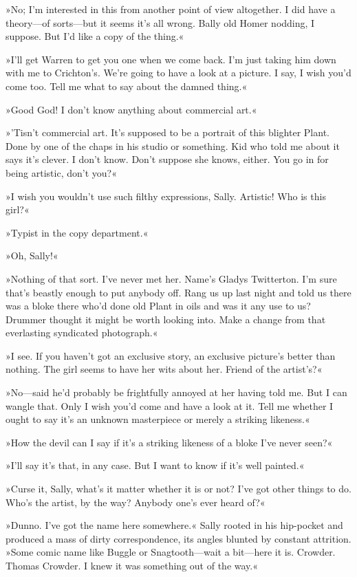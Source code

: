 »No; I'm interested in this from another point of view altogether. I did have a theory—of sorts—but it seems it's all wrong. Bally old Homer nodding, I suppose. But I'd like a copy of the thing.«

»I'll get Warren to get you one when we come back. I'm just taking him down with me to Crichton's. We're going to have a look at a picture. I say, I wish you'd come too. Tell me what to say about the damned thing.«

»Good God! I don't know anything about commercial art.«

»'Tisn't commercial art. It's supposed to be a portrait of this blighter Plant. Done by one of the chaps in his studio or something. Kid who told me about it says it's clever. I don't know. Don't suppose she knows, either. You go in for being artistic, don't you?«

»I wish you wouldn't use such filthy expressions, Sally. Artistic! Who is this girl?«

»Typist in the copy department.«

»Oh, Sally!«

»Nothing of that sort. I've never met her. Name's Gladys Twitterton. I'm sure that's beastly enough to put anybody off. Rang us up last night and told us there was a bloke there who'd done old Plant in oils and was it any use to us? Drummer thought it might be worth looking into. Make a change from that everlasting syndicated photograph.«

»I see. If you haven't got an exclusive story, an exclusive picture's better than nothing. The girl seems to have her wits about her. Friend of the artist's?«

»No—said he'd probably be frightfully annoyed at her having told me. But I can wangle that. Only I wish you'd come and have a look at it. Tell me whether I ought to say it's an unknown masterpiece or merely a striking likeness.«

»How the devil can I say if it's a striking likeness of a bloke I've never seen?«

»I'll say it's that, in any case. But I want to know if it's well painted.«

»Curse it, Sally, what's it matter whether it is or not? I've got other things to do. Who's the artist, by the way? Anybody one's ever heard of?«

»Dunno. I've got the name here somewhere.« Sally rooted in his hip-pocket and produced a mass of dirty correspondence, its angles blunted by constant attrition. »Some comic name like Buggle or Snagtooth—wait a bit—here it is. Crowder. Thomas Crowder. I knew it was something out of the way.«

